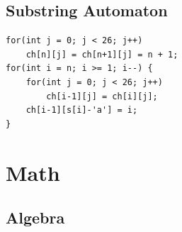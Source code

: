 \documentclass[10pt]{ctexart}
\begin{document}
{\subsection{Substring Automaton}
\begin{lstlisting}
for(int j = 0; j < 26; j++) 
	ch[n][j] = ch[n+1][j] = n + 1;
for(int i = n; i >= 1; i--) {
	for(int j = 0; j < 26; j++) 
		ch[i-1][j] = ch[i][j];
	ch[i-1][s[i]-'a'] = i;
}
\end{lstlisting}

\newpage
\section{Math}
\subsection{Algebra}
}
\end{document}
